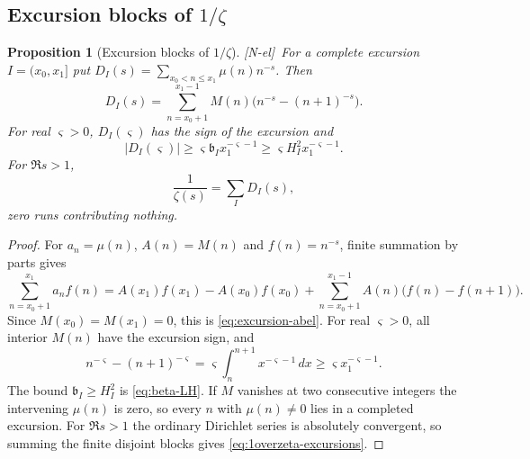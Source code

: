 \documentclass[11pt]{amsart}
\numberwithin{equation}{section}
\theoremstyle{plain}
\newtheorem{proposition}[theorem]{Proposition}
\theoremstyle{definition}
\theoremstyle{remark}
\newcommand{\tagNE}{\textup{[N-el]}}
\begin{document}
\subsection{Excursion blocks of $1/\zeta$}

\begin{proposition}[Excursion blocks of $1/\zeta$]
\label{prop:excursion-mellin}
\tagNE\ For a complete excursion $I=(x_0,x_1]$ put
$D_I(s)=\sum_{x_0<n\le x_1}\mu(n)n^{-s}$. Then
\begin{equation}
\label{eq:excursion-abel}
D_I(s)=\sum_{n=x_0+1}^{x_1-1}M(n)
\bigl(n^{-s}-(n+1)^{-s}\bigr).
\end{equation}
For real $\varsigma>0$, $D_I(\varsigma)$ has the sign of the excursion and
\begin{equation}
\label{eq:excursion-mass-lower}
|D_I(\varsigma)|\ge
\varsigma\mathfrak b_I x_1^{-\varsigma-1}
\ge\varsigma H_I^2x_1^{-\varsigma-1}.
\end{equation}
For $\Re s>1$,
\begin{equation}
\label{eq:1overzeta-excursions}
\frac1{\zeta(s)}=\sum_I D_I(s),
\end{equation}
zero runs contributing nothing.
\end{proposition}

\begin{proof}
For $a_n=\mu(n)$, $A(n)=M(n)$ and $f(n)=n^{-s}$, finite summation by
parts gives
\[
 \sum_{n=x_0+1}^{x_1}a_nf(n)
 =A(x_1)f(x_1)-A(x_0)f(x_0)
 +\sum_{n=x_0+1}^{x_1-1}A(n)\bigl(f(n)-f(n+1)\bigr).
\]
Since $M(x_0)=M(x_1)=0$, this is \eqref{eq:excursion-abel}.  For real
$\varsigma>0$, all interior $M(n)$ have the excursion sign, and
\[
 n^{-\varsigma}-(n+1)^{-\varsigma}
 =\varsigma\int_n^{n+1}x^{-\varsigma-1}\,dx
 \ge\varsigma x_1^{-\varsigma-1}.
\]
The bound $\mathfrak b_I\ge H_I^2$ is \eqref{eq:beta-LH}.  If $M$ vanishes at
two consecutive integers the intervening $\mu(n)$ is zero, so every
$n$ with $\mu(n)\ne0$ lies in a completed excursion.  For $\Re s>1$
the ordinary Dirichlet series is absolutely convergent, so summing the
finite disjoint blocks gives \eqref{eq:1overzeta-excursions}.
\end{proof}
\end{document}
